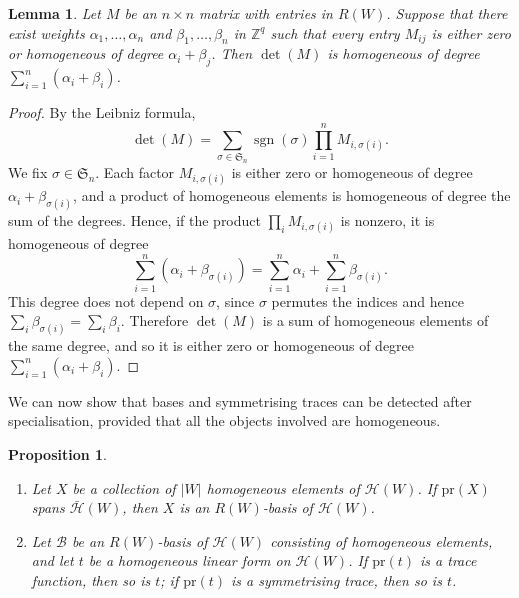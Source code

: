 \documentclass[11pt, reqno]{amsart}
\numberwithin{equation}{section}
\newtheorem{lemma}[theorem]{Lemma}
\newtheorem{proposition}[theorem]{Proposition}
\theoremstyle{remark}
\begin{document}
\begin{lemma}\label{homog}
	Let $M$ be an $n\times n$ matrix with entries in $R(W)$. Suppose that there exist weights
	$\alpha_1,\ldots,\alpha_n$ and $\beta_1,\ldots,\beta_n$ in $\mathbb{Z}^q$ such that every entry $M_{ij}$ is
	either zero or homogeneous of degree $\alpha_i+\beta_j$. Then $\det(M)$ is homogeneous of degree
	$\sum_{i=1}^n(\alpha_i+\beta_i)$.
\end{lemma}
\begin{proof}
	By the Leibniz formula,
	\[
	\det(M)=\sum_{\sigma\in\mathfrak S_n}\operatorname{sgn}(\sigma)\prod_{i=1}^nM_{i,\sigma(i)}.
	\]
	We fix $\sigma\in\mathfrak S_n$. Each factor $M_{i,\sigma(i)}$ is either zero or homogeneous of degree
	$\alpha_i+\beta_{\sigma(i)}$, and a product of homogeneous elements is homogeneous of degree the sum of the
	degrees. Hence, if the product $\prod_iM_{i,\sigma(i)}$ is nonzero, it is homogeneous of degree
	\[
	\sum_{i=1}^n(\alpha_i+\beta_{\sigma(i)})=\sum_{i=1}^n\alpha_i+\sum_{i=1}^n\beta_{\sigma(i)}.
	\]
	This degree does not depend on $\sigma$, since $\sigma$ permutes the indices and hence
	$\sum_i\beta_{\sigma(i)}=\sum_i\beta_i$. Therefore $\det(M)$ is a sum of homogeneous elements of the same
	degree, and so it is either zero or homogeneous of degree $\sum_{i=1}^n(\alpha_i+\beta_i)$.
\end{proof} 
We can now show that bases and symmetrising traces can be detected
after specialisation, provided that all the objects involved are
homogeneous.
	
	\begin{proposition}\label{prop:lift}
\begin{enumerate}
\item Let $X$ be a collection of $|W|$ homogeneous elements of
  $\mathcal H(W)$. If $\mathrm{pr}(X)$ spans $\bar{\mathcal H}(W)$, then
  $X$ is an $R(W)$-basis of $\mathcal H(W)$.
\item Let $\mathcal B$ be an $R(W)$-basis of $\mathcal H(W)$ consisting
  of homogeneous elements, and let $t$ be a homogeneous linear
  form on $\mathcal H(W)$. If $\mathrm{pr}(t)$ is a trace
  function, then so is $t$; if $\mathrm{pr}(t)$ is a
  symmetrising trace, then so is $t$.
\end{enumerate}
\end{proposition}
\end{document}
